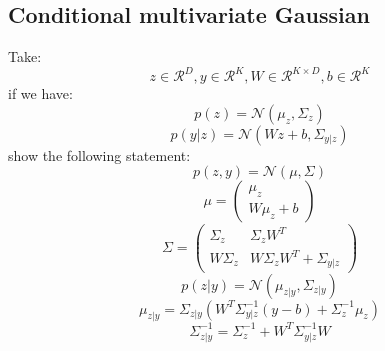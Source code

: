 \subsection{Conditional multivariate Gaussian}
Take:
$$z\in \mathcal{R}^D , y \in \mathcal{R}^K , W \in \mathcal{R}^{K \times D} , b \in \mathcal{R}^K$$
if we have:
$$p(z) = \mathcal{N}(\mu_z , \Sigma_z)$$
$$p(y|z) = \mathcal{N}(Wz + b , \Sigma_{y|z})$$
show the following statement:
$$p(z,y) = \mathcal{N}(\mu , \Sigma)$$
$$\mu = \begin{pmatrix}\mu_z \\ W\mu_z+b\end{pmatrix}$$
$$\Sigma = \begin{pmatrix}\Sigma_z & \Sigma_zW^T \\ W\Sigma_z & W\Sigma_zW^T + \Sigma_{y|z}\end{pmatrix}$$
$$p(z|y) = \mathcal{N}(\mu_{z|y} , \Sigma_{z|y})$$
$$\mu_{z|y} = \Sigma_{z|y}(W^T\Sigma_{y|z}^{-1}(y-b) + \Sigma_{z}^{-1} \mu_z)$$
$$\Sigma_{z|y}^{-1} = \Sigma_z^{-1} + W^T\Sigma_{y|z}^{-1}W$$ 
